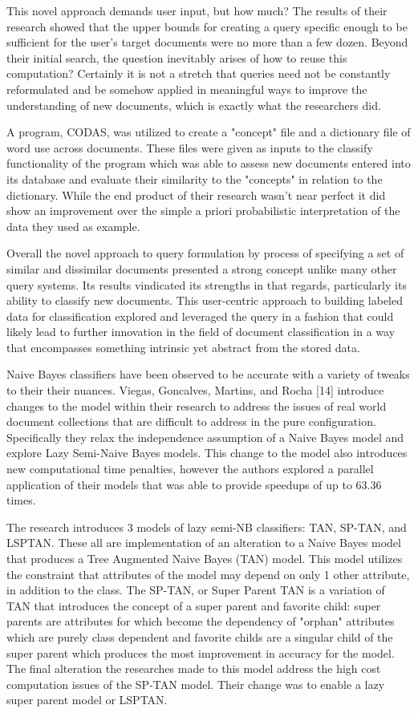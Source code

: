 \documentclass[11pt,a4paper]{article}
\begin{document}
This novel approach demands user input, but how much? The results of their research showed that the upper bounds for creating a query specific enough to be sufficient for the user's target documents were no more than a few dozen. Beyond their initial search, the question inevitably arises of how to reuse this computation? Certainly it is not a stretch that queries need not be constantly reformulated and be somehow applied in meaningful ways to improve the understanding of new documents, which is exactly what the researchers did.

A program, CODAS, was utilized to create a "concept" file and a dictionary file of word use across documents. These files were given as inputs to the classify functionality of the program which was able to assess new documents entered into its database and evaluate their similarity to the "concepts" in relation to the dictionary. While the end product of their research wasn't near perfect it did show an improvement over the simple a priori probabilistic interpretation of the data they used as example.

Overall the novel approach to query formulation by process of specifying a set of similar and dissimilar documents presented a strong concept unlike many other query systems. Its results vindicated its strengths in that regards, particularly its ability to classify new documents. This user-centric approach to building labeled data for classification explored and leveraged the query in a fashion that could likely lead to further innovation in the field of document classification in a way that encompasses something intrinsic yet abstract from the stored data.

Naive Bayes classifiers have been observed to be accurate with a variety of tweaks to their their nuances. Viegas, Goncalves, Martins, and Rocha [14] introduce changes to the model within their research to address the issues of real world document collections that are difficult to address in the pure configuration. Specifically they relax the independence assumption of a Naive Bayes model and explore Lazy Semi-Naive Bayes models. This change to the model also introduces new computational time penalties, however the authors explored a parallel application of their models that was able to provide speedups of up to 63.36 times.

The research introduces 3 models of lazy semi-NB classifiers: TAN, SP-TAN, and LSPTAN. These all are implementation of an alteration to a Naive Bayes model that produces a Tree Augmented Naive Bayes (TAN) model. This model utilizes the constraint that attributes of the model may depend on only 1 other attribute, in addition to the class. The SP-TAN, or Super Parent TAN is a variation of TAN that introduces the concept of a super parent and favorite child: super parents are attributes for which become the dependency of "orphan" attributes which are purely class dependent and favorite childs are a singular child of the super parent which produces the most improvement in accuracy for the model. The final alteration the researches made to this model address the high cost computation issues of the SP-TAN model. Their change was to enable a lazy super parent model or LSPTAN.
\end{document}
